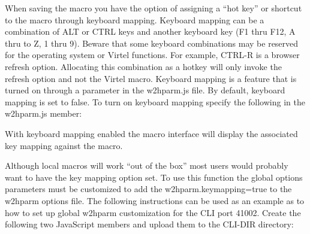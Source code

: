 \documentclass[letterpaper,10pt,english]{sphinxmanual}
\begin{document}
When saving the macro you have the option of assigning a “hot key” or shortcut to the macro through keyboard mapping. Keyboard mapping can be a combination of ALT or CTRL keys and another keyboard key (F1 thru F12, A thru to Z, 1 thru 9). Beware that some keyboard combinations may be reserved for the operating system or Virtel functions. For example, CTRL-R is a browser refresh option. Allocating this combination as a hotkey will only invoke the refresh option and not the Virtel macro. Keyboard mapping is a feature that is turned on through a parameter in the w2hparm.js file. By default, keyboard mapping is set to false. To turn on keyboard mapping specify the following in the w2hparm.js member:

\begin{sphinxVerbatim}[commandchars=\\\{\}]
\end{sphinxVerbatim}

With keyboard mapping enabled the macro interface will display the associated key mapping against the macro.



\ignorespaces 
{}

Although local macros will work “out of the box” most users would probably want to have the key mapping option set. To use this function the global options parameters must be customized to add the w2hparm.keymapping=true to the w2hparm options file. The following instructions can be used as an example as to how to set up global w2hparm customization for the CLI port 41002. Create the following two JavaScript members and upload them to the CLI-DIR directory:

\begin{sphinxVerbatim}[commandchars=\\\{\}]
   
\end{sphinxVerbatim}
\end{document}
